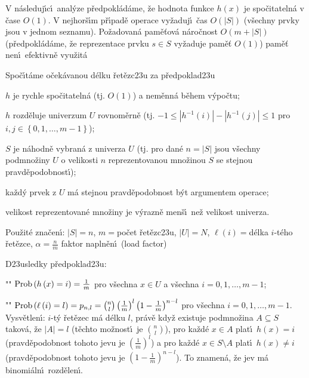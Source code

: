 \flushpar V n\'asleduj\'\i c\'\i\ anal\'yze p\v redpokl\'ad\'ame, \v ze hodnota funkce $
h\left(x\right)$ 
je spo\v citateln\'a v \v case $O\left(1\right)$.\newline 
V nejhor\v s\'\i m p\v r\'\i pad\v e operace vy\v zaduj\'\i\ \v cas $
O\left(|S|\right)$ 
(v\v sechny prv\-ky jsou v jednom seznamu). \newline 
Po\v zadovan\'a pam\v e\v tov\'a n\'aro\v cnost $O\left(m+|S|\right)$ 
(p\v redpokl\'ad\'ame, \v ze reprezentace prvku $s\in S$ vy\v zaduje pam\v e\v t $
O\left(1\right)$)\newline 
pam\v e\v t nen\'\i\ efektivn\v e vyu\v zit\'a
\smallskip

\flushpar Spo\v c\'\i t\'ame o\v cek\'avanou d\'elku \v ret\v ezc\accent23u za 
p\v redpoklad\accent23u
\roster
\item 
$h$ je rychle spo\v citateln\'a (tj. $O\left(1\right)$) a nem\v enn\'a b\v ehem 
v\'ypo\v ctu;
\item
$h$ rozd\v eluje univerzum $U$ rovnom\v ern\v e (tj. 
$-1\le |h^{-1}\left(i\right)|-|h^{-1}\left(j\right)|\le 1$ pro $i,j\in \left\{0,1,\dots,m-1\right\}$);
\item 
$S$ je n\'ahodn\v e vybran\'a z univerza $U$ (tj. pro dan\'e $
n=|S|$ 
jsou v\v sechny podmno\v zi\-ny $U$ o velikosti $n$ reprezentovanou 
mno\v zinou $S$ se stejnou pravd\v epodobnost\'\i );
\item
ka\v zd\'y prvek z $U$ m\'a stejnou pravd\v epodobnost b\'yt 
argumentem operace;
\item
velikost reprezentovan\'e mno\v ziny je v\'yrazn\v e men\v s\'\i\ ne\v z 
velikost univerza.
\endroster


\flushpar Pou\v zit\'e zna\v cen\'\i : $|S|=n$, $m=$po\v cet 
\v ret\v ezc\accent23u, $|U|=N$,\newline 
$\ell \left(i\right)=$d\'elka $i$-t\'eho \v ret\v ezce, $\alpha =\frac nm$ faktor napln\v en\'\i\ (load factor)
\smallskip

\flushpar D\accent23usledky p\v redpoklad\accent23u:
\roster
\item"{}"
$\operatorname{Prob}\left(h\left(x\right)=i\right)=\frac 1m$ pro v\v sechna $x\in U$ a v\v sechna 
$i=0,1,\dots,m-1$; 
\item"{}"
$\operatorname{Prob}\left(\ell \left(i\right)=l\right)=p_{n,l}=\binom nl\left(\frac 1m\right)^l\left(1-\frac 1m\right)^{n-l}$ 
pro v\v sechna $i=0,1,\dots,m-1$.
\endroster
\flushpar Vysv\v etlen\'\i : $i$-t\'y \v ret\v ezec m\'a d\'elku $l$, pr\'av\v e kdy\v z existuje 
pod\-mno\-\v zina $A\subseteq S$ takov\'a, \v ze $|A|=l$ (t\v echto mo\v znost\'\i\ je 
$\binom nl$), pro ka\v zd\'e $x\in A$ plat\'\i\ $h\left(x\right)=i$ (pravd\v epodobnost 
tohoto jevu je $\left(\frac 1m\right)^l$) a pro ka\v zd\'e $x\in S\setminus 
A$ plat\'\i\ $h\left(x\right)\ne i$ 
(pravd\v epodobnost tohoto jevu je $\left(1-\frac 1m\right)^{n-l}$). To znamen\'a, \v ze jev m\'a 
binomi\'aln\'\i\ rozd\v elen\'\i.
\medskip

